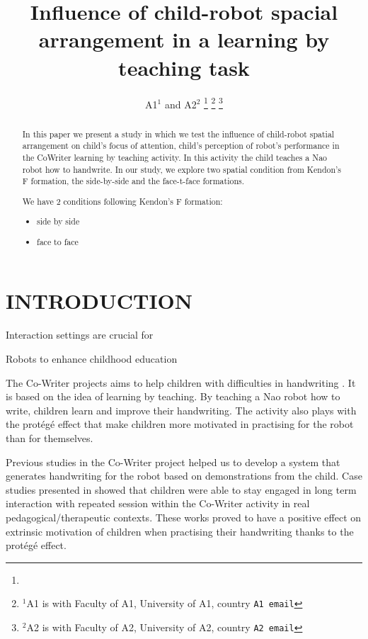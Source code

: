 \documentclass[letterpaper, 10 pt, conference]{ieeeconf}  %
\title{\LARGE \bf
Influence of child-robot spacial arrangement in a learning by teaching task}
\author{A1$^{1}$ and A2$^{2}$%
\thanks{}%
\thanks{$^{1}$A1 is with Faculty of A1,
        University of A1, country
        {\tt\small A1 email}}%
\thanks{$^{2}$A2 is with Faculty of A2,
        University of A2, country
        {\tt\small A2 email}}%
}
\begin{document}
\maketitle
\thispagestyle{empty}
\pagestyle{empty}


\begin{abstract}
In this paper we present a study in which we test the influence of child-robot spatial arrangement on child's focus of attention, child's perception of robot's performance in the CoWriter learning by teaching activity.
In this activity the child teaches a Nao robot how to handwrite. 
In our study, we explore two spatial condition from Kendon's F formation, the side-by-side and the face-t-face formations. 

We have 2 conditions following Kendon's F formation: 
\begin{itemize}
\item side by side
\item face to face
\end{itemize}



\end{abstract}


\section{INTRODUCTION}
Interaction settings are crucial for 

Robots to enhance childhood education


The Co-Writer projects aims to help children with difficulties in handwriting \cite{hood2015when}. 
It is based on the idea of learning by teaching. 
By teaching a Nao robot how to write, children learn and improve their handwriting. 
The activity also plays with the protégé effect that make children more motivated in practising for the robot than for themselves. 

Previous studies in the Co-Writer project helped us to develop a system that generates handwriting for the robot based on demonstrations from the child\cite{hood2015when}. 
Case studies presented in \cite{jacq2016building} showed that children were able to stay engaged in long term interaction with repeated session within the Co-Writer activity in real pedagogical/therapeutic contexts. 
These works proved to have a positive effect on extrinsic motivation of children when practising their handwriting thanks to the protégé effect. 
\end{document}
